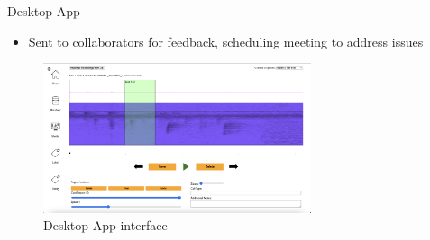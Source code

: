 \begin{frame}{Desktop App}
    \begin{itemize}
        \item Sent to collaborators for feedback, scheduling meeting to address issues
    \end{itemize}
    \begin{figure}
        \centering
        \includegraphics[height=0.7\textheight,width=0.7\textwidth,keepaspectratio]{images/desktop_app_1.png}
        \caption{Desktop App interface}
    \end{figure}
\end{frame}


